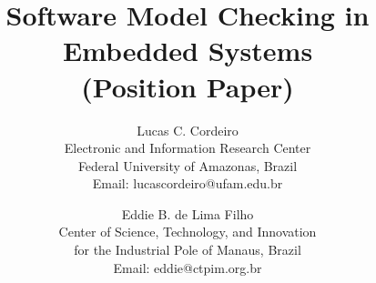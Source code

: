 \documentclass{acm_sen_article}
\begin{document}
%
\title{Software Model Checking in Embedded Systems \\ (Position Paper)}


\author{Lucas C. Cordeiro \\
Electronic and Information Research Center\\
Federal University of Amazonas, Brazil\\
Email: lucascordeiro@ufam.edu.br
\and
Eddie B. de Lima Filho \\
Center of Science, Technology, and Innovation \\ for the Industrial Pole of Manaus, Brazil \\
Email: eddie@ctpim.org.br}


% 
\end{document}

